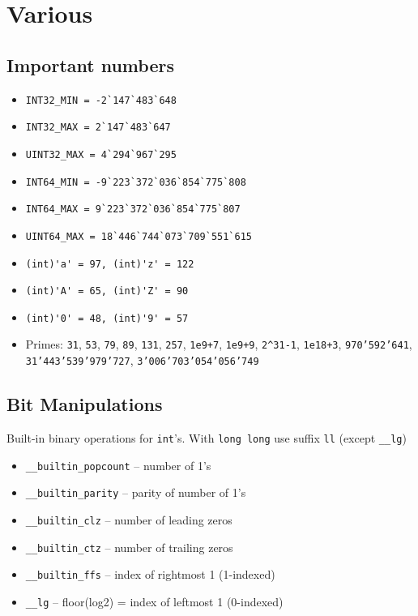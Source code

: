 \section{Various}

\subsection{Important numbers}

\vspace{0.7em}
\begin{itemize}
    \item \verb|INT32_MIN = -2`147`483`648|
    \item \verb|INT32_MAX = 2`147`483`647|
    \item \verb|UINT32_MAX = 4`294`967`295|
    \item \verb|INT64_MIN = -9`223`372`036`854`775`808|
    \item \verb|INT64_MAX = 9`223`372`036`854`775`807|
    \item \verb|UINT64_MAX = 18`446`744`073`709`551`615|
    \item \verb|(int)'a' = 97, (int)'z' = 122|
    \item \verb|(int)'A' = 65, (int)'Z' = 90|
    \item \verb|(int)'0' = 48, (int)'9' = 57|
    \item Primes: \verb|31|, \verb|53|, \verb|79|, \verb|89|, \verb|131|, \verb|257|, \verb|1e9+7|, \verb|1e9+9|, \verb|2^31-1|, \verb|1e18+3|, \verb|970’592’641|, \verb|31’443’539’979’727|, \verb|3’006’703’054’056’749|
\end{itemize}

\vspace{0.3em}

\subsection{Bit Manipulations}

Built-in binary operations for \verb|int|'s. With \verb|long long| use suffix \verb|ll| (except \verb|__lg|)

\vspace{0.3em}
\begin{itemize}
    \item \verb|__builtin_popcount| -- number of 1's
    \item \verb|__builtin_parity| -- parity of number of 1's
    \item \verb|__builtin_clz| -- number of leading zeros
    \item \verb|__builtin_ctz| -- number of trailing zeros
    \item \verb|__builtin_ffs| -- index of rightmost 1 (1-indexed)
    \item \verb|__lg| -- floor(log2) = index of leftmost 1 (0-indexed)
\end{itemize}

